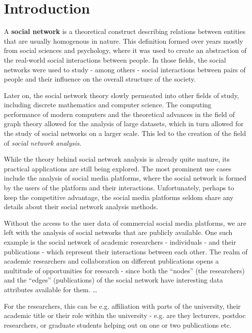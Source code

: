 \chapter*{Introduction}

A \textbf{social network} is a theoretical construct describing relations between entities that are usually homogenous in nature.
This definition formed over years mostly from social sciences and psychology, where it was used to create an abstraction of the real-world social interactions between people.
In those fields, the social networks were used to study - among others - social interactions between pairs of people and their influence on the overall structure of the society.

Later on, the social network theory slowly permeated into other fields of study, including discrete mathematics and computer science.
The computing performance of modern computers and the theoretical advances in the field of graph theory allowed for the analysis of large datasets, which in turn allowed for the study of social networks on a larger scale.
This led to the creation of the field of \textit{social network analysis}.

While the theory behind social network analysis is already quite mature, its practical applications are still being explored.
The most prominent use cases include the analysis of social media platforms, where the social network is formed by the users of the platform and their interactions.
Unfortunately, perhaps to keep the competitive advantage, the social media platforms seldom share any details about their social network analysis methods.

Without the access to the user data of commercial social media platforms, we are left with the analysis of social networks that are publicly available.
One such example is the social network of academic researchers - individuals - and their publications - which represent their interactions between each other.
The realm of academic researchers and collaboration on different publications opens a multitude of opportunities for research - since both the ``nodes'' (the researchers) and the ``edges'' (publications) of the social network have interesting data attributes available for them. 
\dots

For the researchers, this can be e.g. affiliation with parts of the university, their academic title or their role within the university - e.g. are they lecturers, postdoc researchers, or graduate students helping out on one or two publications etc.

